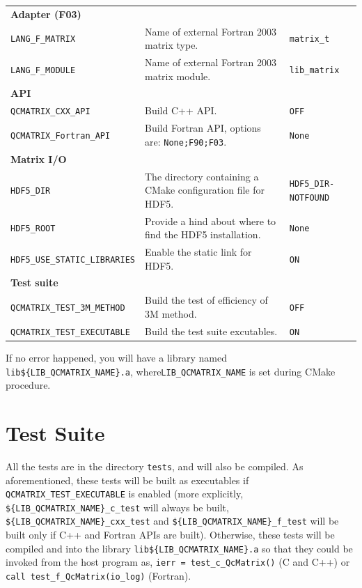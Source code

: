 \documentclass[a4paper,11pt,twoside,openright]{book}
\begin{document}
\begin{center}
\begin{longtable}{l|p{}|l}
    \hline
    \textbf{Adapter (F03)} & &\\
    \verb|LANG_F_MATRIX| & Name of external Fortran 2003 matrix type. & \verb|matrix_t|\\
    \verb|LANG_F_MODULE| & Name of external Fortran 2003 matrix module. & \verb|lib_matrix|\\
    \hline
    \textbf{API} & &\\
    \verb|QCMATRIX_CXX_API| & Build C++ API. & \verb|OFF|\\
    \verb|QCMATRIX_Fortran_API| & Build Fortran API, options are: \verb|None;F90;F03|. & \verb|None|\\
    \hline
    \textbf{Matrix I/O} & &\\
    \verb|HDF5_DIR| %
      & The directory containing a CMake configuration file for HDF5. & \verb|HDF5_DIR-NOTFOUND|\\
    \verb|HDF5_ROOT| & Provide a hind about where to find the HDF5 installation. & \verb|None|\\
    \verb|HDF5_USE_STATIC_LIBRARIES| & Enable the static link for HDF5. & \verb|ON|\\
    \hline
    \textbf{Test suite} & &\\
    \verb|QCMATRIX_TEST_3M_METHOD| & Build the test of efficiency of 3M method. & \verb|OFF|\\
    \verb|QCMATRIX_TEST_EXECUTABLE| & Build the test suite excutables. & \verb|ON|\\
  \end{longtable}
\end{center}
\vspace*{-5ex}

If no error happened, you will have a library named \verb|lib${LIB_QCMATRIX_NAME}.a|,
where\linebreak \verb|LIB_QCMATRIX_NAME| is set during CMake procedure.

\section{Test Suite}
\label{section-test-suite}

All the tests are in the directory \verb|tests|, and will also be compiled.
As aforementioned, these tests will be built as executables if
\verb|QCMATRIX_TEST_EXECUTABLE| is enabled (more explicitly,
\verb|${LIB_QCMATRIX_NAME}_c_test| will always be built,
\verb|${LIB_QCMATRIX_NAME}_cxx_test| and \verb|${LIB_QCMATRIX_NAME}_f_test|
will be built only if C++ and Fortran APIs are built). Otherwise, these
tests will be compiled and into the library \verb|lib${LIB_QCMATRIX_NAME}.a|
so that they could be invoked from the host program as,\linebreak
\verb|ierr = test_c_QcMatrix()| (C and C++) or \verb|call test_f_QcMatrix(io_log)|
(Fortran).
\end{document}

